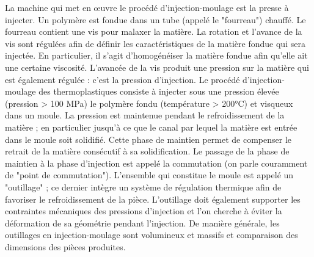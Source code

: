 La machine qui met en œuvre le procédé d'injection-moulage est la presse à injecter.
Un polymère est fondue dans un tube (appelé le "fourreau") chauffé.  %
Le fourreau contient une vis pour malaxer la matière.  %
La rotation et l'avance de la vis sont régulées afin de définir les caractéristiques de la matière fondue qui sera injectée.
En particulier, il s'agit d'homogénéiser la matière fondue afin qu'elle ait une certaine viscosité.
L'avancée de la vis produit une pression sur la matière qui est également régulée : c'est la pression d'injection.
Le procédé d’injection-moulage des thermoplastiques consiste à injecter sous une pression élevée (pression > 100 MPa) le polymère fondu (température > 200°C) et visqueux dans un moule.
La pression est maintenue pendant le refroidissement de la matière ; en particulier jusqu'à ce que le canal par lequel la matière est entrée dans le moule soit solidifié.
Cette phase de maintien permet de compenser le retrait de la matière consécutif à sa solidification.
Le passage de la phase de maintien à la phase d'injection est appelé la commutation (on parle couramment de "point de commutation").
L'ensemble qui constitue le moule est appelé un "outillage" ; ce dernier intègre un système de régulation thermique afin de favoriser le refroidissement de la pièce.
L'outillage doit également supporter les contraintes mécaniques des pressions d'injection et l'on cherche à éviter la déformation de sa géométrie pendant l'injection.
De manière générale, les outillages en injection-moulage sont volumineux et massifs et comparaison des dimensions des pièces produites.

